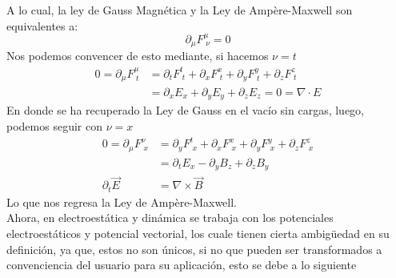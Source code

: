 \documentclass[../main.tex]{subfiles}
\begin{document}
 A lo cual, la ley de Gauss Magnética y la Ley de Ampère-Maxwell son equivalentes a:
 \begin{equation}
   \partial_\mu F^{\mu}_{\; \nu} = 0
  \end{equation}
  Nos podemos convencer de esto mediante, si hacemos $\nu=t$
  \begin{align*}
    0 = \partial_\mu F^\mu_{\; t} & = \partial_t F^t_{\; t} + \partial_x F^x_{\; t} + \partial_y F^y_{\; t} + \partial_z F^z_{\;t} \\
    & = \partial_x E_x + \partial_y E_y + \partial_z E_z = 0 = \nabla \cdot E
  \end{align*}
  En donde se ha recuperado la Ley de Gauss en el vacío sin cargas, luego, podemos seguir con $\nu=x$
  \begin{align*}
    0 = \partial_\mu F^\nu_{\; x} &  = \partial_y F^t_{\; x} + \partial_x F^x_{\; x} + \partial_y F^y_{\; x} + \partial_z F^z_{\; x} \\
    & = \partial_t E_x - \partial_y B_z + \partial_z B_y \\
    \partial_t\vec{E} & = \nabla \times \vec{B}
  \end{align*}
  Lo que nos regresa la Ley de Ampère-Maxwell. \\
  Ahora, en electroestática y dinámica se trabaja con los potenciales electroestáticos y potencial vectorial, los cuale tienen cierta ambigüedad en su definición, ya que, estos no son únicos, si no que pueden ser transformados a convenciencia del usuario para su aplicación, esto se debe a lo siguiente
\end{document}
